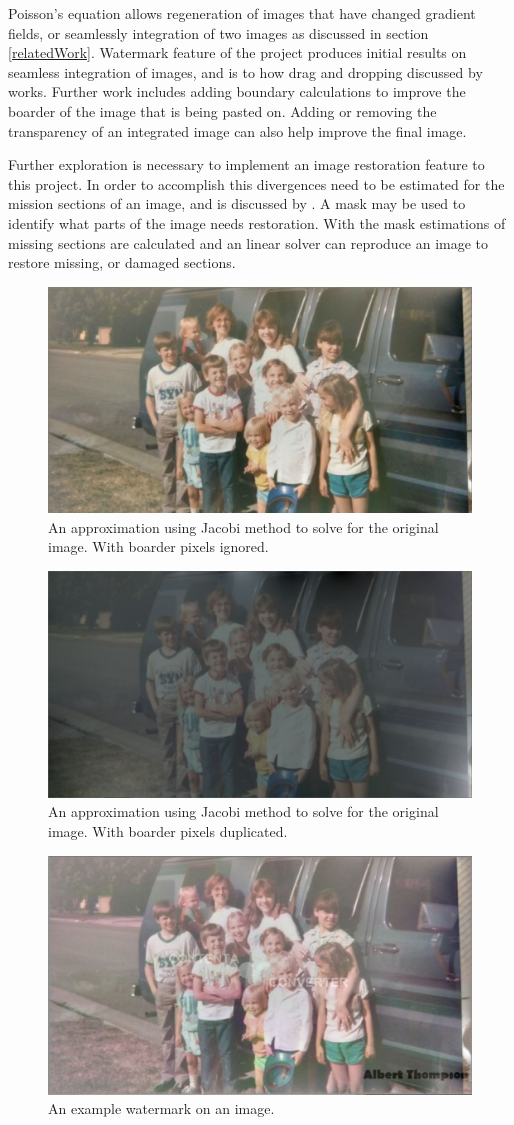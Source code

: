 \documentclass[10pt,twopage]{acmsiggraph}
\begin{document}
Poisson's equation allows regeneration of images that have changed gradient fields, or seamlessly integration of two images as discussed in section \ref{relatedWork}. Watermark feature of the project produces initial results on seamless integration of images, and is to how drag and dropping discussed by \cite{ddp} works. Further work includes adding boundary calculations to improve the boarder of the image that is being pasted on. Adding or removing the transparency of an integrated image can also help improve the final image. 

Further exploration is necessary to implement an image restoration feature to this project. In order to accomplish this divergences need to be estimated for the mission sections of an image, and is discussed by \cite{Perez}. A mask may be used to identify what parts of the image needs restoration. With the mask estimations of missing sections are calculated and an linear solver can reproduce an image to restore missing, or damaged sections. 

\begin{figure}
\centering
\includegraphics[width=.44\textwidth]{fig/familyResult.jpg}
\caption{An approximation using Jacobi method to solve for the original image. With boarder pixels ignored.}
\label{familyResult}
\end{figure}

\begin{figure}
\centering
\includegraphics[width=.44\textwidth]{fig/familyBoarder.jpg}
\caption{An approximation using Jacobi method to solve for the original image. With boarder pixels duplicated.}
\label{familyBoarder}
\end{figure}

\begin{figure}
\centering
\includegraphics[width=.44\textwidth]{fig/mask.jpg}
\caption{An example watermark on an image.}
\label{mask}
\end{figure}
\end{document}
